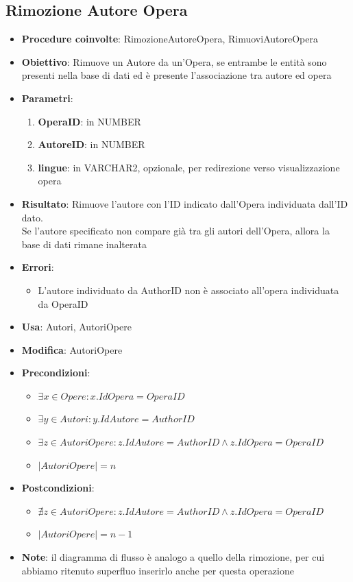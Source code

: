 \subsection{Rimozione Autore Opera}
\begin{itemize}
	\item \textbf{Procedure coinvolte}: RimozioneAutoreOpera, RimuoviAutoreOpera
	\item \textbf{Obiettivo}: Rimuove un Autore da un'Opera, se entrambe le entità sono presenti nella base di dati ed è presente l'associazione tra autore ed opera
	\item \textbf{Parametri}:
	\begin{enumerate}
		\item \textbf{OperaID}: in NUMBER
		\item \textbf{AutoreID}: in NUMBER
		\item \textbf{lingue}: in VARCHAR2, opzionale, per redirezione verso visualizzazione opera
	\end{enumerate}
	\item \textbf{Risultato}: Rimuove l'autore con l'ID indicato dall'Opera individuata dall'ID dato.\\
	Se l'autore specificato non compare già tra gli autori dell'Opera, allora la base di dati rimane inalterata
	\item \textbf{Errori}:
	\begin{itemize}
		\item L'autore individuato da AuthorID non è associato all'opera individuata da OperaID
	\end{itemize}
	\item \textbf{Usa}: Autori, AutoriOpere
	\item \textbf{Modifica}: AutoriOpere
	\item \textbf{Precondizioni}:
	\begin{itemize}
		\item $\exists x \in Opere : x.IdOpera = OperaID$
		\item $\exists y \in Autori : y.IdAutore = AuthorID$
		\item $\exists z \in AutoriOpere : z.IdAutore = AuthorID \land z.IdOpera = OperaID$
		\item $|AutoriOpere| = n$
	\end{itemize}
	\item \textbf{Postcondizioni}:
	\begin{itemize}
		\item $\nexists z \in AutoriOpere : z.IdAutore = AuthorID \land z.IdOpera = OperaID$
		\item $|AutoriOpere| = n - 1$\\
	\end{itemize}
	\item \textbf{Note}: il diagramma di flusso è analogo a quello della rimozione, per cui abbiamo ritenuto superfluo inserirlo anche per questa operazione
\end{itemize}

